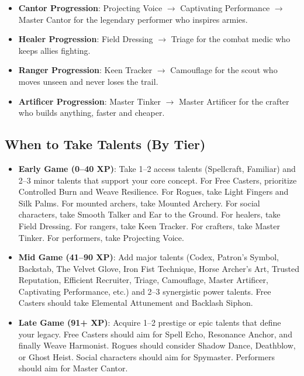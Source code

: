 {{\begin{itemize}
  \item \textbf{Cantor Progression}: Projecting Voice $\rightarrow$ Captivating Performance $\rightarrow$ Master Cantor for the legendary performer who inspires armies.
  \item \textbf{Healer Progression}: Field Dressing $\rightarrow$ Triage for the combat medic who keeps allies fighting.
  \item \textbf{Ranger Progression}: Keen Tracker $\rightarrow$ Camouflage for the scout who moves unseen and never loses the trail.
  \item \textbf{Artificer Progression}: Master Tinker $\rightarrow$ Master Artificer for the crafter who builds anything, faster and cheaper.
\end{itemize}

\subsection*{When to Take Talents (By Tier)}
\label{sec:when-to-take-talents}
\begin{itemize}
  \item \textbf{Early Game (0--40 XP)}: Take 1--2 access talents (Spellcraft, Familiar) and 2--3 minor talents that support your core concept. For Free Casters, prioritize Controlled Burn and Weave Resilience. For Rogues, take Light Fingers and Silk Palms. For mounted archers, take Mounted Archery. For social characters, take Smooth Talker and Ear to the Ground. For healers, take Field Dressing. For rangers, take Keen Tracker. For crafters, take Master Tinker. For performers, take Projecting Voice.
  \item \textbf{Mid Game (41--90 XP)}: Add major talents (Codex, Patron's Symbol, Backstab, The Velvet Glove, Iron Fist Technique, Horse Archer's Art, Trusted Reputation, Efficient Recruiter, Triage, Camouflage, Master Artificer, Captivating Performance, etc.) and 2--3 synergistic power talents. Free Casters should take Elemental Attunement and Backlash Siphon.
  \item \textbf{Late Game (91+ XP)}: Acquire 1--2 prestige or epic talents that define your legacy. Free Casters should aim for Spell Echo, Resonance Anchor, and finally Weave Harmonist. Rogues should consider Shadow Dance, Deathblow, or Ghost Heist. Social characters should aim for Spymaster. Performers should aim for Master Cantor.
\end{itemize}

}}
